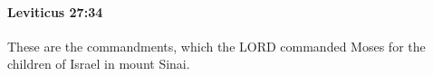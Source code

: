 		\paragraph{Leviticus 27:34} %
			\label{LEVITICUS-27-34}

			These are the commandments, which the LORD commanded Moses for the children of Israel in mount Sinai.

